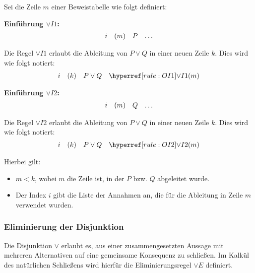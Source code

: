 \documentclass[main.tex]{subfiles}
\begin{document}
\begin{definition}
Sei die Zeile \(m\) einer Beweistabelle wie folgt definiert:

\textbf{Einführung \(\lor I1\):}
\[
\begin{array}{l l l l}
    i & (m) & P & \dots \\
\end{array}
\]

Die Regel \(\lor I1\) erlaubt die Ableitung von \(P \lor Q\) in einer neuen Zeile \(k\). Dies wird wie folgt notiert:
\[
\begin{array}{l l l l}
    i & (k) & P \lor Q & \rOIa{m} \\
\end{array}
\]

\textbf{Einführung \(\lor I2\):}
\[
\begin{array}{l l l l}
    i & (m) & Q & \dots \\
\end{array}
\]

Die Regel \(\lor I2\) erlaubt die Ableitung von \(P \lor Q\) in einer neuen Zeile \(k\). Dies wird wie folgt notiert:
\[
\begin{array}{l l l l}
    i & (k) & P \lor Q & \rOIb{m} \\
\end{array}
\]

Hierbei gilt:
\begin{itemize}
    \item \(m < k\), wobei \(m\) die Zeile ist, in der \(P\) bzw. \(Q\) abgeleitet wurde.
    \item Der Index \(i\) gibt die Liste der Annahmen an, die für die Ableitung in Zeile \(m\) verwendet wurden.
\end{itemize}

\end{definition}

\subsubsection{Eliminierung der Disjunktion}
\label{rule:OE}
Die Disjunktion \(\lor\) erlaubt es, aus einer zusammengesetzten Aussage mit mehreren Alternativen auf eine gemeinsame Konsequenz zu schließen. Im Kalkül des natürlichen Schließens wird hierfür die Eliminierungsregel \(\lor E\) definiert.
\end{document}

